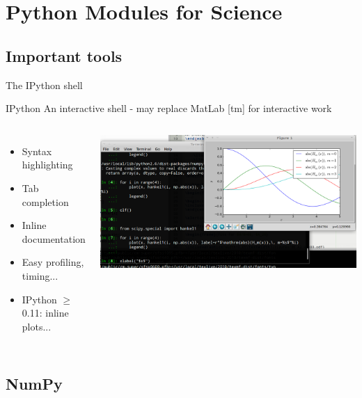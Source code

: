 \section{Python Modules for Science}

\subsection{Important tools}

\begin{frame}{The IPython shell}

\begin{exbox}{IPython}
An interactive shell - may replace MatLab [tm] for interactive work
\end{exbox}

\begin{columns}

\begin{itemize}
	\item Syntax highlighting
	\item Tab completion
	\item Inline documentation
	\item Easy profiling, timing...
	\item IPython $\ge$ 0.11: inline plots...
\end{itemize}


\includegraphics[width=\textwidth]{Figures/Ipython1.png}

\end{columns}

\end{frame}

\subsection{NumPy}

